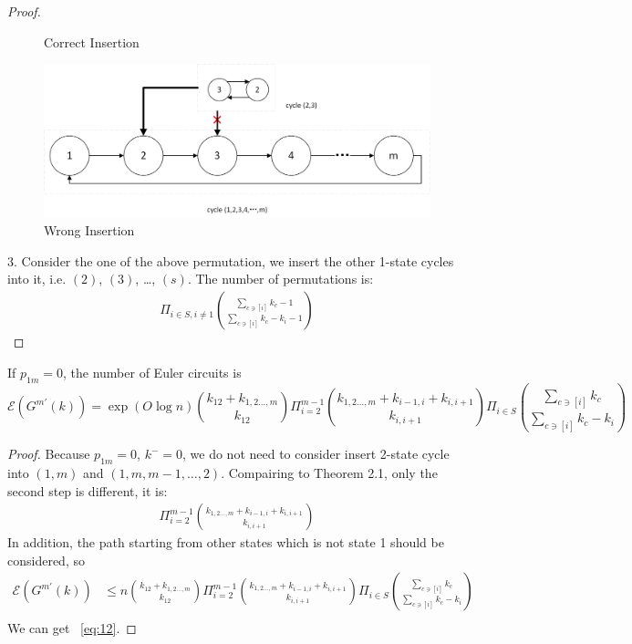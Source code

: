 \documentclass[11pt,en,cite=authoryear]{elegantpaper}
\begin{document}
\begin{proof}
\begin{figure}[h]
        \caption{Correct Insertion}
        \label{fig:insert1}
    \end{figure} 
    \begin{figure}[h] 
        \centering
        \includegraphics[scale=0.5]{chart/insert2.png}
        \caption{Wrong Insertion}
        \label{fig:insert2} 
    \end{figure}

    3. Consider the one of the  above permutation, we insert the other 1-state cycles into it, i.e. $(2)$, $(3)$, \dots, $(s)$.  The number of permutations is:
    \begin{align*}
        \Pi_{i\in S, i\neq 1} \binom{\sum_{c \ni [i]} k_{c} - 1}{\sum_{c \ni [i]} k_{c} - k_{i} - 1}
    \end{align*}
\end{proof}

\begin{corollary}
    If $p_{1m}=0$, the number of Euler circuits is 
    \begin{equation} \label{eq:12}
        \mathcal{E} (G^{m'} (k))
        = \exp(O \log n)  \binom{k_{12}+k_{1,2\dots ,m}}{k_{12}} 
        \Pi_{i=2}^{m-1} \binom{k_{1,2\dots ,m}+ k_{i-1, i}+ k_{i, i+1}}{k_{i, i+1}}
        \Pi_{i \in S} \binom{\sum_{c \ni [i]} k_{c}}{\sum_{c \ni [i]} k_{c} - k_{i}}
    \end{equation}
\end{corollary}
\begin{proof}
    Because $p_{1m}=0$, $k^-=0$, we do not need to consider insert 2-state cycle  into $(1,m)$ and $(1, m, m-1, \dots, 2)$. Compairing to Theorem 2.1, only the second step is different, it is:
    \begin{align*}
        \Pi_{i=2}^{m-1} \binom{k_{1,2\dots ,m}+ k_{i-1, i}+ k_{i, i+1}}{k_{i, i+1}}
    \end{align*}
    In addition, the path starting from other states which is not state 1 should be considered, so
    \begin{align*}
        \mathcal{E} (G^{m'} (k))
        &\le  n \binom{k_{12}+k_{1,2\dots ,m}}{k_{12}} 
        \Pi_{i=2}^{m-1} \binom{k_{1,2\dots ,m}+ k_{i-1, i}+ k_{i, i+1}}{k_{i, i+1}}
        \Pi_{i \in S} \binom{\sum_{c \ni [i]} k_{c}}{\sum_{c \ni [i]} k_{c} - k_{i}}\\
    \end{align*}
    We can get ~\ref{eq:12}.
\end{proof}
\end{document}
